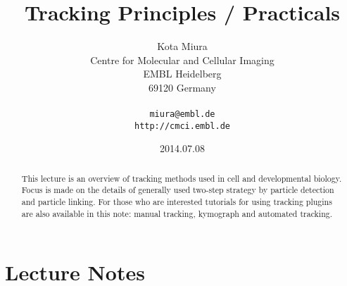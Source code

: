 \documentclass[11pnt]{article}
\begin{document}
\author{Kota Miura\\
  Centre for Molecular and Cellular Imaging\\
  EMBL Heidelberg\\
  69120  Germany\\
  \\
  \texttt{miura@embl.de}\\
  \texttt{http://cmci.embl.de}}
\date{2014.07.08}
\title{Tracking Principles / Practicals}
\maketitle

\begin{abstract}
This lecture is an overview of tracking methods used in cell and developmental biology. Focus is made on the details of generally used two-step strategy by particle detection and particle linking. For those who are interested tutorials for using tracking plugins are also available in this note: manual tracking, kymograph and automated tracking. 
\end{abstract}

\section{Lecture Notes}
\end{document}
